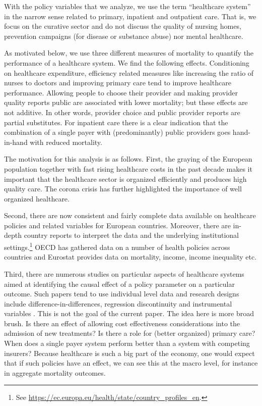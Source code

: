 \documentclass[a4paper,12pt]{article}
\begin{document}
With the policy variables that we analyze, we use the term ``healthcare system'' in the narrow sense related to primary, inpatient and outpatient care. That is, we focus on the curative sector and do not discuss the quality of nursing homes, prevention campaigns (for disease or substance abuse) nor mental healthcare.

As motivated below, we use three different measures of mortality to quantify the performance of a healthcare system. We find the following effects. Conditioning on healthcare expenditure, efficiency related measures like increasing the ratio of nurses to doctors and improving primary care tend to improve healthcare performance. Allowing people to choose their provider and making provider quality reports public are associated with lower mortality; but these effects are not additive. In other words, provider choice and public provider reports are partial substitutes. For inpatient care there is a clear indication that the combination of a single payer with (predominantly) public providers goes hand-in-hand with reduced mortality.

The motivation for this analysis is as follows. First, the graying of the European population together with fast rising healthcare costs in the past decade makes it important that the healthcare sector is organized efficiently and produces high quality care. The corona crisis has further highlighted the importance of well organized healthcare.

Second, there are now consistent and fairly complete data available on healthcare policies and related variables for European countries.  Moreover, there are in-depth country reports to interpret the data and the underlying institutional settings.\footnote{See \url{https://ec.europa.eu/health/state/country\_profiles\_en}.} OECD has gathered data on a number of health policies across countries and Eurostat provides data on mortality, income, income inequality etc.

Third, there are numerous studies on particular aspects of healthcare systems aimed at identifying the causal effect of a policy parameter on a particular outcome. Such papers tend to use individual level data and research designs include difference-in-differences, regression discontinuity and instrumental variables \citep{econometricevaluation}. This is not the goal of the current paper. The idea here is more broad brush. Is there an effect of allowing cost effectiveness considerations into the admission of new treatments? Is there a role for (better organized) primary care? When does a single payer system perform better than a system with competing insurers? Because healthcare is such a big part of the economy, one would expect that if such policies have an effect, we can see this at the macro level, for instance in aggregate mortality outcomes.
\end{document}
